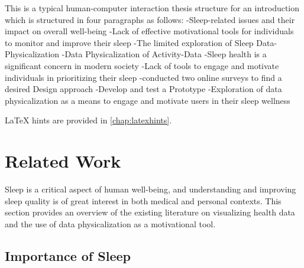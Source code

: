 \documentclass[
  a4paper,  %
  twoside,  %
  bibliography=totoc,
  headsepline,
  cleardoublepage=empty,
  parskip=half,
  draft=false
]{scrbook}
\begin{document}
This is a typical human-computer interaction thesis structure for an introduction which is structured in four paragraphs as follows:
-Sleep-related issues and their impact on overall well-being
\newline
-Lack of effective motivational tools for individuals to monitor and improve their sleep
-The limited exploration of Sleep Data-Physicalization
-Data Physicalization of Activity-Data
-Sleep health is a significant concern in modern society
\newline
-Lack of tools to engage and motivate individuals in prioritizing their sleep
-conducted two online surveys to find a desired Design approach
\newline
-Develop and test a Prototype
-Exploration of data physicalization as a means to engage and motivate users in their sleep wellness

LaTeX hints are provided in \autoref{chap:latexhints}.











\chapter{Related Work}

Sleep is a critical aspect of human well-being, and understanding and improving sleep quality is of great interest in both medical and personal contexts. This section provides an overview of the existing literature on visualizing health data and the use of data physicalization as a motivational tool.

\section{Importance of Sleep}
\end{document}
